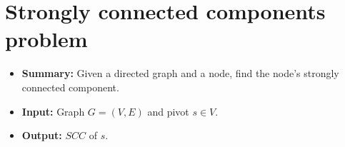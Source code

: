\section{Strongly connected components problem}
\begin{itemize}
    \item \textbf{Summary:} Given a directed graph and a node, find the node's strongly connected component.
    \item \textbf{Input:} Graph $G=(V,E)$ and pivot $s \in V$.
    \item \textbf{Output:} $SCC$ of $s$.
\end{itemize}



